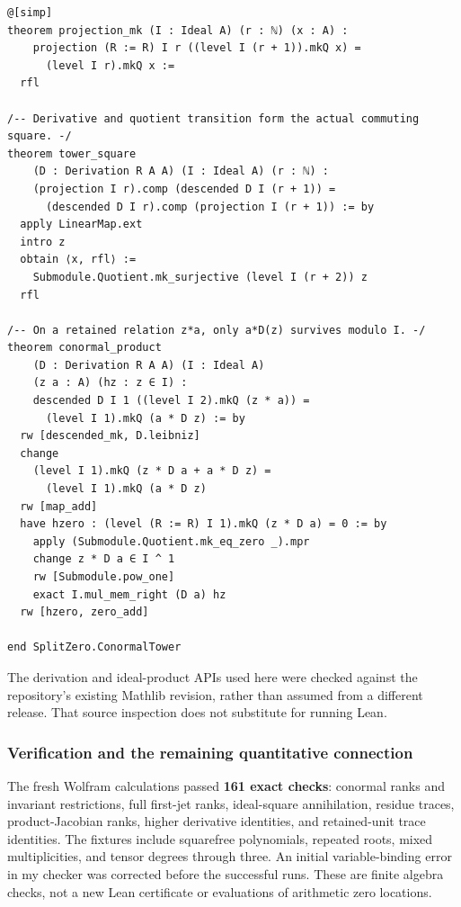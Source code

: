 \begin{verbatim}
@[simp]
theorem projection_mk (I : Ideal A) (r : ℕ) (x : A) :
    projection (R := R) I r ((level I (r + 1)).mkQ x) =
      (level I r).mkQ x :=
  rfl

/-- Derivative and quotient transition form the actual commuting square. -/
theorem tower_square
    (D : Derivation R A A) (I : Ideal A) (r : ℕ) :
    (projection I r).comp (descended D I (r + 1)) =
      (descended D I r).comp (projection I (r + 1)) := by
  apply LinearMap.ext
  intro z
  obtain ⟨x, rfl⟩ :=
    Submodule.Quotient.mk_surjective (level I (r + 2)) z
  rfl

/-- On a retained relation z*a, only a*D(z) survives modulo I. -/
theorem conormal_product
    (D : Derivation R A A) (I : Ideal A)
    (z a : A) (hz : z ∈ I) :
    descended D I 1 ((level I 2).mkQ (z * a)) =
      (level I 1).mkQ (a * D z) := by
  rw [descended_mk, D.leibniz]
  change
    (level I 1).mkQ (z * D a + a * D z) =
      (level I 1).mkQ (a * D z)
  rw [map_add]
  have hzero : (level (R := R) I 1).mkQ (z * D a) = 0 := by
    apply (Submodule.Quotient.mk_eq_zero _).mpr
    change z * D a ∈ I ^ 1
    rw [Submodule.pow_one]
    exact I.mul_mem_right (D a) hz
  rw [hzero, zero_add]

end SplitZero.ConormalTower
\end{verbatim}

The derivation and ideal-product APIs used here were checked against the repository's existing
Mathlib revision, rather than assumed from a different release. That source inspection does not
substitute for running Lean.

\subsubsection{Verification and the remaining quantitative
connection}\label{conormal_tower_pasted:verification-and-the-remaining-quantitative-connection}

The fresh Wolfram calculations passed \textbf{161 exact checks}: conormal ranks and invariant
restrictions, full first-jet ranks, ideal-square annihilation, residue traces, product-Jacobian
ranks, higher derivative identities, and retained-unit trace identities. The fixtures include
squarefree polynomials, repeated roots, mixed multiplicities, and tensor degrees through three. An
initial variable-binding error in my checker was corrected before the successful runs. These are
finite algebra checks, not a new Lean certificate or evaluations of arithmetic zero locations.

